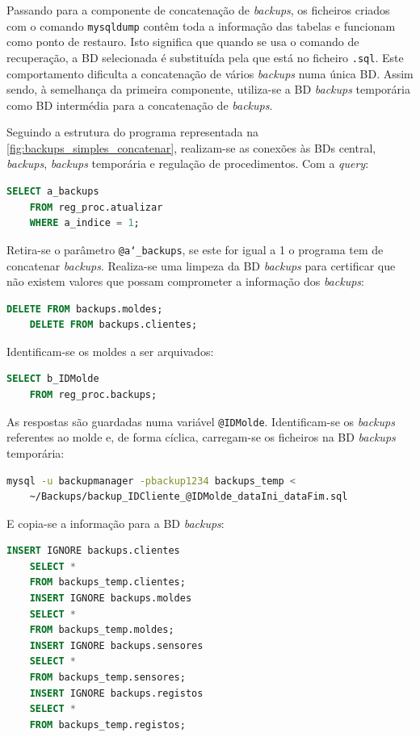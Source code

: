 \documentclass[11pt,twoside,a4paper]{report}
\begin{document}
Passando para a componente de concatenação de \textit{backups}, os ficheiros criados com o comando \texttt{mysqldump} contêm toda a informação das tabelas e funcionam como ponto de restauro. Isto significa que quando se usa o comando de recuperação, a BD selecionada é substituída pela que está no ficheiro \texttt{.sql}. Este comportamento dificulta a concatenação de vários \textit{backups} numa única BD. Assim sendo, à semelhança da primeira componente, utiliza-se a BD \textit{backups} temporária como BD intermédia para a concatenação de \textit{backups}.\par 
Seguindo a estrutura do programa representada na \autoref{fig:backups_simples_concatenar}, realizam-se as conexões às BDs central, \textit{backups}, \textit{backups} temporária e regulação de procedimentos. Com a \textit{query}:
\begin{lstlisting}[language = SQL]
	SELECT a_backups
	FROM reg_proc.atualizar
	WHERE a_indice = 1;
\end{lstlisting}
Retira-se o parâmetro \texttt{@a\char`_backups}, se este for igual a 1 o programa tem de concatenar \textit{backups}. Realiza-se uma limpeza da BD \textit{backups} para certificar que não existem valores que possam comprometer a informação dos \textit{backups}:
\begin{lstlisting}[language = SQL]
	DELETE FROM backups.moldes;
	DELETE FROM backups.clientes;
\end{lstlisting}
Identificam-se os moldes a ser arquivados:
\begin{lstlisting}[language = SQL]
	SELECT b_IDMolde
	FROM reg_proc.backups;
\end{lstlisting}
As respostas são guardadas numa variável \texttt{@IDMolde}. Identificam-se os \textit{backups} referentes ao molde e, de forma cíclica, carregam-se os ficheiros na BD \textit{backups} temporária:
\begin{lstlisting}[language = bash]
	mysql -u backupmanager -pbackup1234 backups_temp <
	~/Backups/backup_IDCliente_@IDMolde_dataIni_dataFim.sql
\end{lstlisting}
E copia-se a informação para a BD \textit{backups}:
\begin{lstlisting}[language = SQL]
	INSERT IGNORE backups.clientes
	SELECT *
	FROM backups_temp.clientes;
	INSERT IGNORE backups.moldes
	SELECT *
	FROM backups_temp.moldes;
	INSERT IGNORE backups.sensores
	SELECT *
	FROM backups_temp.sensores;
	INSERT IGNORE backups.registos
	SELECT *
	FROM backups_temp.registos;
\end{lstlisting}
\end{document}

